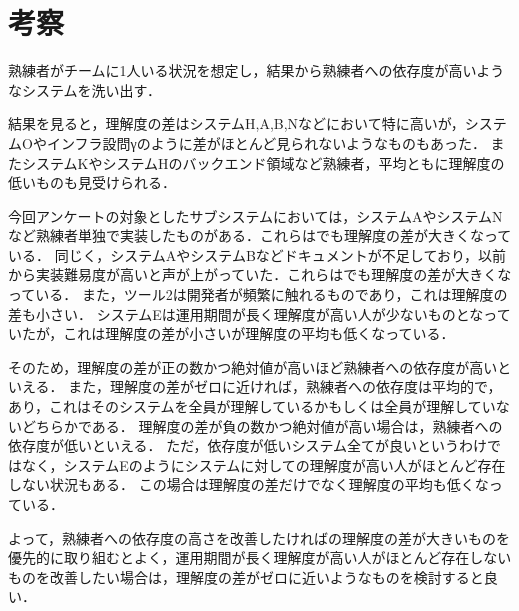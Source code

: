 \section{考察}
熟練者がチームに1人いる状況を想定し，結果から熟練者への依存度が高いようなシステムを洗い出す．

結果を見ると，理解度の差はシステムH,A,B,Nなどにおいて特に高いが，システムOやインフラ設問γのように差がほとんど見られないようなものもあった．
またシステムKやシステムHのバックエンド領域など熟練者，平均ともに理解度の低いものも見受けられる．

今回アンケートの対象としたサブシステムにおいては，システムAやシステムNなど熟練者単独で実装したものがある．これらはでも理解度の差が大きくなっている．
同じく，システムAやシステムBなどドキュメントが不足しており，以前から実装難易度が高いと声が上がっていた．これらはでも理解度の差が大きくなっている．
また，ツール2は開発者が頻繁に触れるものであり，これは理解度の差も小さい．
システムEは運用期間が長く理解度が高い人が少ないものとなっていたが，これは理解度の差が小さいが理解度の平均も低くなっている．

そのため，理解度の差が正の数かつ絶対値が高いほど熟練者への依存度が高いといえる．
また，理解度の差がゼロに近ければ，熟練者への依存度は平均的で，あり，これはそのシステムを全員が理解しているかもしくは全員が理解していないどちらかである．
理解度の差が負の数かつ絶対値が高い場合は，熟練者への依存度が低いといえる．
ただ，依存度が低いシステム全てが良いというわけではなく，システムEのようにシステムに対しての理解度が高い人がほとんど存在しない状況もある．
この場合は理解度の差だけでなく理解度の平均も低くなっている．

よって，熟練者への依存度の高さを改善したければの理解度の差が大きいものを優先的に取り組むとよく，運用期間が長く理解度が高い人がほとんど存在しないものを改善したい場合は，理解度の差がゼロに近いようなものを検討すると良い．
